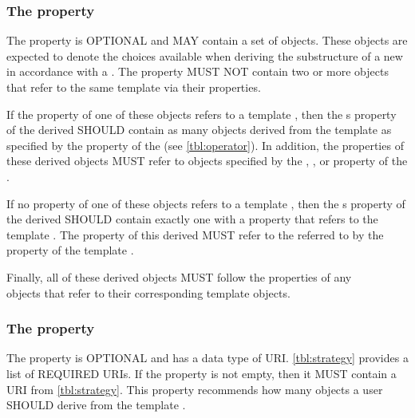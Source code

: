 \subsubsection*{ The  property}\label{sec:variableComponents}

The  property is OPTIONAL and MAY contain a set of  objects. These  objects are expected to denote the choices available when deriving the substructure of a new  in accordance with a . The  property MUST NOT contain two or more  objects that refer to the same template  via their  properties.

If the  property of one of these  objects refers to a template , then the s property of the derived  SHOULD contain as many  objects derived from the template  as specified by the  property of the  (see \ref{tbl:operator}). In addition, the  properties of these derived  objects MUST refer to  objects specified by the , , or  property of the .

If no  property of one of these  objects refers to a template , then the s property of the derived  SHOULD contain exactly one  with a  property that refers to the template . The  property of this derived  MUST refer to the  referred to by the  property of the template .

Finally, all of these derived  objects MUST follow the  properties of any \\
 objects that refer to their corresponding template  objects.

\subsubsection*{ The  property}\label{sec:strategy}
The  property is OPTIONAL and has a data type of URI. \ref{tbl:strategy} provides a list of REQUIRED  URIs. If the  property is not empty, then it MUST contain a URI from \ref{tbl:strategy}. This property recommends how many  objects a user SHOULD derive from the template .


